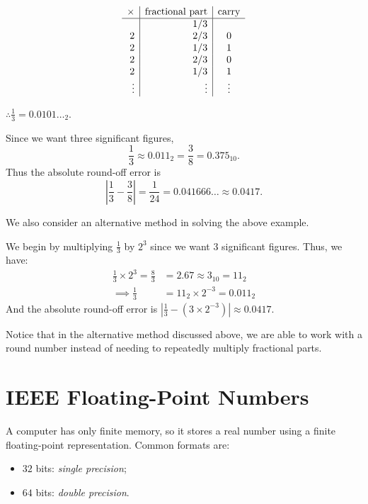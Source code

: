 \begin{solution}[4.1cm]
\[
\begin{array}{r|r|c}
\times & \text{fractional part} & \text{carry}\\
\hline
  & 1/3 & \\
2 & 2/3 & 0\\
2 & 1/3 & 1\\
2 & 2/3 & 0\\
2 & 1/3 & 1\\
\vdots & \vdots & \vdots
\end{array}
\]

$\therefore \displaystyle{\frac13=0.0101\ldots_2.}$

\medskip
Since we want three significant figures, 
\[
 \frac13\approx0.011_2=\frac38=0.375_{10}.
\]
Thus the absolute round-off error is
\[
 \left|\frac13-\frac38\right|=\frac1{24}
 =0.041666\ldots\approx0.0417.
\]
\end{solution}

We also consider an alternative method in solving the above example.

\begin{solution}[4.0cm]
We begin by multiplying $\displaystyle{\frac13}$ by $2^3$ since we want 3 significant figures.
Thus, we have:
\begin{align*}
    \frac13 \times 2^3 = \frac83 &= 2.67 \approx 3_{10} = 11_2 \\
    \implies \frac13 &= 11_2 \times 2^{-3} = 0.011_2
\end{align*}
And the absolute round-off error is $\displaystyle{\left|\frac13 - (3 \times 2^{-3})\right| \approx 0.0417}$.
\end{solution}

Notice that in the alternative method discussed above, we are able to work with a round number instead of needing to repeatedly multiply fractional parts.

\section{IEEE Floating-Point Numbers}

A computer has only finite memory, so it stores a real number using a finite floating-point representation. Common formats are:
\begin{itemize}
  \item $32$ bits: \emph{single precision};
  \item $64$ bits: \emph{double precision}.
\end{itemize}

